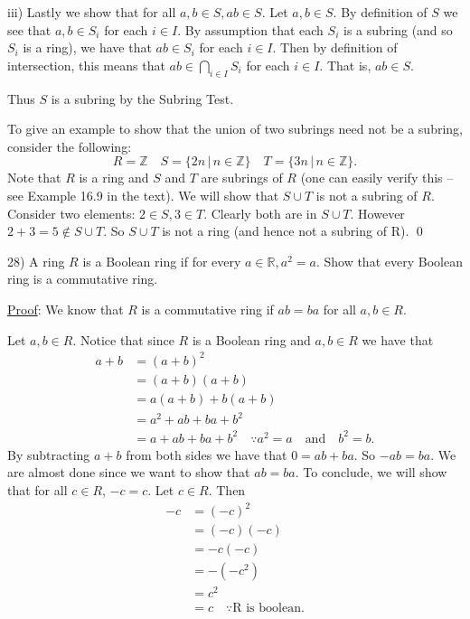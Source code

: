 \documentclass{article}
\begin{document}
iii) Lastly we show that for all $a, b \in S, ab \in S$. Let $a, b \in S$. By definition of $S$ we see that $a, b \in S_i$ for each $i \in I$. By assumption that each $S_i$ is a subring (and so $S_i$ is a ring), we have that $ab \in S_i$ for each $i \in I$. Then by definition of intersection, this means that $ab \in \underset{i \in I}{\bigcap} S_i$ for each $i \in I$. That is, $ab \in S$.

Thus $S$ is a subring by the Subring Test.

To give an example to show that the union of two subrings need not be a subring, consider the following:
$$R = \mathbb{Z} \quad S = \{2n \, \vert \, n \in \mathbb{Z} \} \quad T = \{3n \, \vert \, n \in \mathbb{Z} \}.$$
Note that $R$ is a ring and $S$ and $T$ are subrings of $R$ (one can easily verify this -- see Example 16.9 in the text). We will show that $S \cup T$ is not a subring of $R$. Consider two elements: $2 \in S, 3 \in T$. Clearly both are in $S \cup T$. However $2 + 3 = 5 \not \in S \cup T$. So $S \cup T$ is not a ring (and hence not a subring of R). \qed

28) A ring $R$ is a Boolean ring if for every $a \in \mathbb{R}, a^2 = a$. Show that every Boolean ring is a commutative ring.

\underline{Proof}: We know that $R$ is a commutative ring if $ab = ba$ for all $a, b \in R$.

Let $a, b \in R$. Notice that since $R$ is a Boolean ring and $a, b \in R$ we have that
\begin{align*}
	a + b &= (a+b)^2 \\
	&= (a+b)(a+b) \\
	&= a(a+b) + b(a+b) \\
	&= a^2 + ab + ba + b^2 \\
	&= a + ab + ba + b^2 \quad \because a^2 = a \quad \text{and} \quad b^2 = b.
\end{align*}
By subtracting $a + b$ from both sides we have that $0 = ab + ba$. So $-ab = ba$. We are almost done since we want to show that $ab = ba$. To conclude, we will show that for all $c \in R$, $-c = c$. Let $c \in R$. Then
\begin{align*}
	-c &= (-c)^2 \\
	&= (-c)(-c) \\
	&= -c(-c) \\
	&= -(-c^2) \\
	&= c^2 \\
	&= c \quad \because \text{R is boolean}.
\end{align*}
\end{document}
